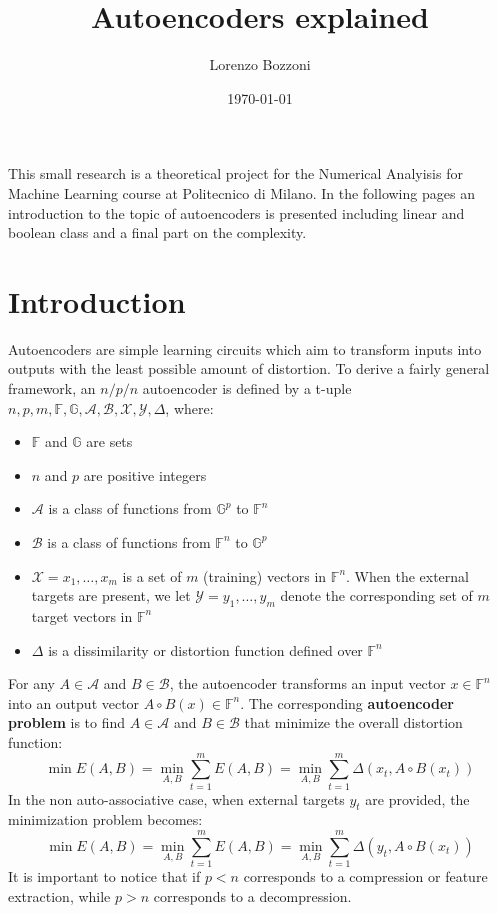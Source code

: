 \documentclass{article}
\title{Autoencoders explained}
\author{Lorenzo Bozzoni}
\date{\today}
\begin{document}
\maketitle

This small research is a theoretical project for the Numerical Analyisis for Machine Learning course at Politecnico di Milano. In the following pages an introduction to the topic of autoencoders is presented including linear and boolean class and a final part on the complexity.

\tableofcontents

\section{Introduction}
Autoencoders are simple learning circuits which aim to transform inputs into outputs with
the least possible amount of distortion. To derive a fairly general framework, an $n/p/n$  autoencoder is defined by a t-uple $n,p,m,\mathbb{F},\mathbb{G},\mathcal{A},\mathcal{B},\mathcal{X},\mathcal{Y}, \Delta$, where:
\begin{itemize}
    \item $\mathbb{F}$ and $\mathbb{G}$ are sets
    \item $n$ and $p$ are positive integers
    \item $\mathcal{A}$ is a class of functions from $\mathbb{G}^p$ to $\mathbb{F}^n$
    \item $\mathcal{B}$ is a class of functions from $\mathbb{F}^n$ to $\mathbb{G}^p$
    \item $\mathcal{X} = {x_1, \dots, x_m}$ is a set of $m$ (training) vectors in $\mathbb{F}^n$. When the external targets are present, we let $\mathcal{Y} = {y_1, \dots, y_m}$ denote the corresponding set of $m$ target vectors in $\mathbb{F}^n$ 
    \item $\Delta$ is a dissimilarity or distortion function defined over $\mathbb{F}^n$
\end{itemize}
For any $A \in \mathcal{A}$ and $B \in \mathcal{B}$, the autoencoder transforms an input vector $x \in \mathbb{F}^n$ into an output vector $A \circ B(x) \in \mathbb{F}^n$. The corresponding \textbf{autoencoder problem} is to find $A \in \mathcal{A}$ and $B \in \mathcal{B}$ that minimize the overall distortion function:
\begin{equation}
    \min E(A,B) = \min_{A ,B} \sum_{t=1}^m E(A,B)=\min_{A ,B} \sum_{t=1}^m \Delta(x_t, A \circ B(x_t))
\end{equation}
In the non auto-associative case, when external targets $y_t$ are provided, the minimization
problem becomes:
\begin{equation}
    \min E(A,B) = \min_{A ,B} \sum_{t=1}^m E(A,B)=\min_{A ,B} \sum_{t=1}^m \Delta(y_t, A \circ B(x_t))
\end{equation}
It is important to notice that if $p < n$ corresponds to a compression or feature extraction, while $p > n$ corresponds to a decompression. 





\end{document}
